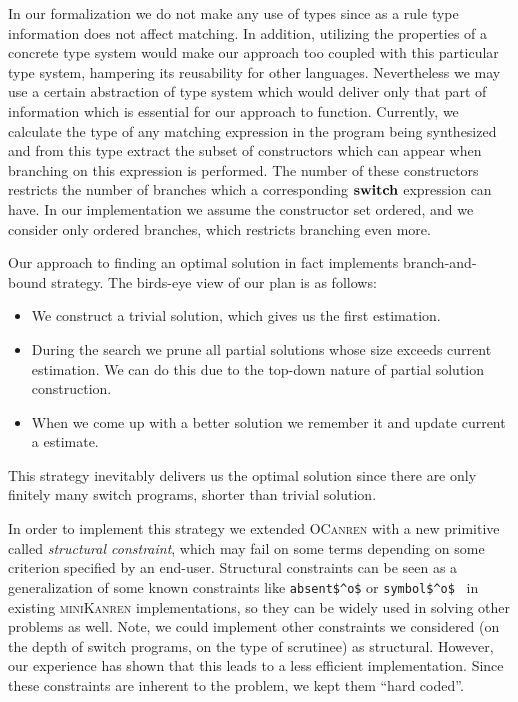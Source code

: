 In our formalization we do not make any use of types since as a rule type information does not affect matching. In addition,
utilizing the properties of a concrete type system would make our approach too coupled with this particular type system, hampering
its reusability for other languages. Nevertheless we may use a certain abstraction of type system which would deliver only
that part of information which is essential for our approach to function. Currently, we calculate the type of any matching expression in
the program being synthesized and from this type extract the subset of constructors which can appear when branching on this expression
is performed. The number of these constructors restricts the number of branches which a corresponding $\mathbf{switch}$ expression can have.
In our implementation we assume the constructor set ordered, and we consider only ordered branches, which restricts branching even more.

Our approach to finding an optimal solution in fact implements branch-and-bound strategy. The birds-eye view of our plan is as follows:

\begin{itemize}
\item We construct a trivial solution, which gives us the first estimation.
\item During the search we prune all partial solutions whose size exceeds current estimation. We can do this due to
  the top-down nature of partial solution construction.
\item When we come up with a better solution we remember it and update current a estimate.
\end{itemize}

\noindent This strategy inevitably delivers us the optimal solution since there are only finitely many switch programs, shorter than trivial solution.

In order to implement this strategy we extended \textsc{OCanren} with a new primitive called \emph{structural constraint}, which may
fail on some terms depending on some criterion specified by an end-user. Structural constraints can be seen as a generalization of
some known constraints like \lstinline|absent$^o$| or \lstinline|symbol$^o$|~\cite{Untagged} in existing \textsc{miniKanren} implementations, 
so they can be widely used in solving other problems as well. Note, we could implement other constraints we considered (on the
depth of switch programs, on the type of scrutinee) as structural. However, our experience has shown that this leads to
a less efficient implementation. Since these constraints are inherent to the problem, we kept them ``hard coded''.
